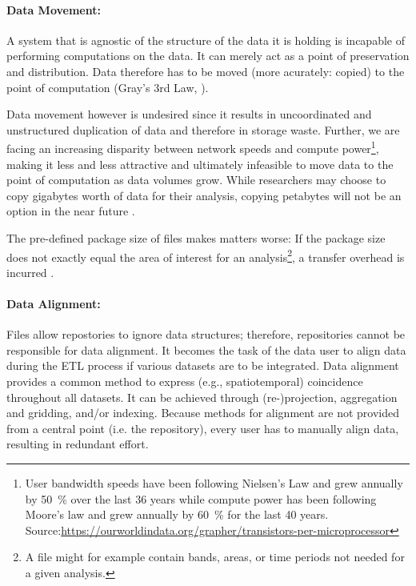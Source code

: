 \documentclass[letterpaper, parskip=half]{scrartcl}
\begin{document}
\paragraph{Data Movement:}
A system that is agnostic of the structure of the data it is holding is incapable of performing computations on the data. 
It can merely act as a point of preservation and distribution. Data therefore has to be moved (more acurately: copied) to the point of computation (Gray's 3rd Law, \cite{Szalay2009}).

Data movement however is undesired since it results in uncoordinated and unstructured duplication of data and therefore in storage waste.
Further, we are facing an increasing disparity between network speeds and compute power\footnote{User bandwidth speeds have been following Nielsen's Law \citep{Nielsen1998} and grew annually by \SI{50}{\percent} over the last 36 years while compute power has been following Moore's law \citep{Moore1975} and grew annually by \SI{60}{\percent} for the last 40 years. Source:\url{https://ourworldindata.org/grapher/transistors-per-microprocessor}}, making it less and less attractive and ultimately infeasible to move data to the point of computation \citep{Hey2009} as data volumes grow. While researchers may choose to copy gigabytes worth of data for their analysis, copying petabytes will not be an option in the near future \citep{Szalay2006}.

The pre-defined package size of files makes matters worse: If the package size does not exactly equal the area of interest for an analysis\footnote{A file might for example contain bands, areas, or time periods not needed for a given analysis.}, a transfer overhead is incurred \citep{Gray2002}.

\paragraph{Data Alignment:}
Files allow repostories to ignore data structures; therefore, repositories cannot be responsible for data alignment.
It becomes the task of the data user to align data during the \gls{ETL} process if various datasets are to be integrated.
Data alignment provides a common method to express (e.g., spatiotemporal) coincidence throughout all datasets.
It can be achieved through (re-)projection, aggregation and gridding, and/or indexing.
Because methods for alignment are not provided from a central point (i.e. the repository), every user has to manually align data, resulting in redundant effort.
\end{document}
